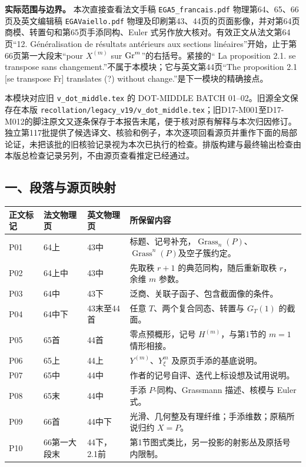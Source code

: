 
\noindent\textbf{实际范围与边界。}
本次直接查看法文手稿 \texttt{EGA5\_francais.pdf} 物理第64、65、66页及英文编辑稿 \texttt{EGAVaiello.pdf} 物理及印刷第43、44页的页面影像，并对第64页商模、转置句和第65页手添同构、Euler 式另作放大核对。有效正文从法文第64页“12. Généralisation de résultats antérieurs aux sections linéaires”开始，止于第66页第一大段末“pour $X^{(m)}$ sur $\operatorname{Gr}^m$”的右括号。紧接的“ La proposition 2.1. se transpose sans changement.”不属于本模块；它与英文第44页“The proposition 2.1 [se transpose Fr] translates (?) without change.”是下一模块的精确接点。

本模块对应旧 \texttt{v\_dot\_middle.tex} 的 DOT-MIDDLE BATCH 01--02。旧源全文保存在本版 \texttt{recollation/legacy\_v19/v\_dot\_middle.tex}；旧D17-M001至D17-M012的脚注原文又逐条保存于本报告末尾，便于核对原有解释与本次归因修订。独立第117批提供了候选译文、核验和例子，本次逐项回看源页并重作下面的局部论证，未把该批的旧核验记录视为本次已执行的检查。排版构建与最终输出检查由本版总检查记录另列，不由源页查看推定已经通过。

\subsection*{一、段落与源页映射}

\begin{longtable}{@{}p{.12\linewidth}p{.16\linewidth}p{.16\linewidth}p{.44\linewidth}@{}}
\toprule
正文标记 & 法文物理页 & 英文物理页 & 所保留内容\\
\midrule
\endhead
P01 & 64上 & 43中 & 标题、记号补充，$\operatorname{Grass}_n(P)$、$\operatorname{Grass}^n(P)$及空子簇约定。\\
P02 & 64上中 & 43中 & 先取秩 $r+1$ 的典范同构，随后重新取秩 $r$，余维 $m$ 参数。\\
P03 & 64中 & 43下 & 泛商、关联子函子、包含截面像的条件。\\
P04 & 64中下 & 43末至44首 & 任意 $T$、两个复合同态、转置与 $G_T(1)$ 的截面。\\
P05 & 65首 & 44首 & 零点预概形，记号 $H^{(m)}$，与第1节的 $m=1$ 情形相接。\\
P06 & 65上 & 44上 & $Y^{(m)}$、$Y^m_\xi$ 及原页手添的基底说明。\\
P07 & 65中 & 44中 & 作者的记号自评、迭代上标设想及试用说明。\\
P08 & 65末 & 44中 & 手添 $P$-同构、Grassmann 描述、核模与 Euler 式。\\
P09 & 66首 & 44中下 & 光滑、几何整及有理纤维；手添维数；原稿所说归约 $X=P$。\\
P10 & 66第一大段末 & 44下，2.1前 & 第1节图式类比，另一投影的射影丛及原括号内限制。\\
\bottomrule
\end{longtable}

